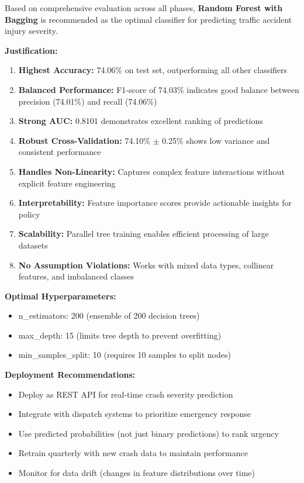 \documentclass[12pt,man]{apa7}
\begin{document}
Based on comprehensive evaluation across all phases, \textbf{Random Forest with Bagging} is recommended as the optimal classifier for predicting traffic accident injury severity.

\textbf{Justification:}
\begin{enumerate}
    \item \textbf{Highest Accuracy:} 74.06\% on test set, outperforming all other classifiers
    \item \textbf{Balanced Performance:} F1-score of 74.03\% indicates good balance between precision (74.01\%) and recall (74.06\%)
    \item \textbf{Strong AUC:} 0.8101 demonstrates excellent ranking of predictions
    \item \textbf{Robust Cross-Validation:} 74.10\% $\pm$ 0.25\% shows low variance and consistent performance
    \item \textbf{Handles Non-Linearity:} Captures complex feature interactions without explicit feature engineering
    \item \textbf{Interpretability:} Feature importance scores provide actionable insights for policy
    \item \textbf{Scalability:} Parallel tree training enables efficient processing of large datasets
    \item \textbf{No Assumption Violations:} Works with mixed data types, collinear features, and imbalanced classes
\end{enumerate}

\textbf{Optimal Hyperparameters:}
\begin{itemize}
    \item n\_estimators: 200 (ensemble of 200 decision trees)
    \item max\_depth: 15 (limits tree depth to prevent overfitting)
    \item min\_samples\_split: 10 (requires 10 samples to split nodes)
\end{itemize}

\textbf{Deployment Recommendations:}
\begin{itemize}
    \item Deploy as REST API for real-time crash severity prediction
    \item Integrate with dispatch systems to prioritize emergency response
    \item Use predicted probabilities (not just binary predictions) to rank urgency
    \item Retrain quarterly with new crash data to maintain performance
    \item Monitor for data drift (changes in feature distributions over time)
\end{itemize}
\end{document}
